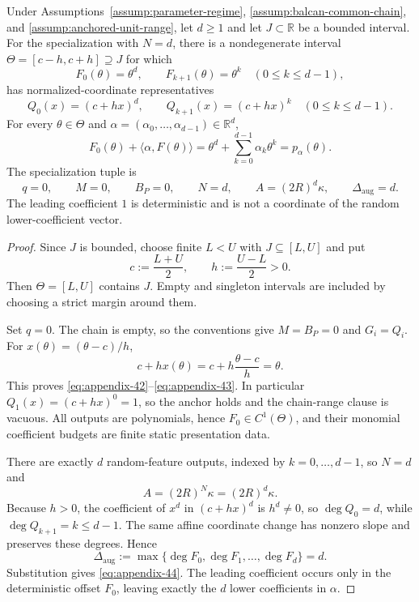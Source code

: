 \begin{proposition}
\label{prop:monic-presentation}
Under Assumptions~\ref{assump:parameter-regime},
\ref{assump:balcan-common-chain}, and
\ref{assump:anchored-unit-range}, let $d\geq1$ and let
$J\subset\mathbb R$ be a bounded interval.  For the specialization with
$N=d$, there is a nondegenerate interval
$\Theta=[c-h,c+h]\supseteq J$ for which
\begin{equation}
F_0(\theta)=\theta^d,
\qquad
F_{k+1}(\theta)=\theta^k\quad(0\leq k\leq d-1),
\label{eq:appendix-42}
\end{equation}
has normalized-coordinate representatives
\begin{equation}
Q_0(x)=(c+hx)^d,
\qquad
Q_{k+1}(x)=(c+hx)^k\quad(0\leq k\leq d-1).
\label{eq:appendix-43}
\end{equation}
For every $\theta\in\Theta$ and
$\alpha=(\alpha_0,\ldots,\alpha_{d-1})\in\mathbb R^d$,
\begin{equation}
F_0(\theta)+\langle\alpha,F(\theta)\rangle
=\theta^d+\sum_{k=0}^{d-1}\alpha_k\theta^k
=p_\alpha(\theta).
\label{eq:appendix-44}
\end{equation}
The specialization tuple is
\begin{equation}
q=0,
\qquad M=0,
\qquad B_P=0,
\qquad N=d,
\qquad A=(2R)^d\kappa,
\qquad \Delta_{\mathrm{aug}}=d.
\label{eq:appendix-45}
\end{equation}
The leading coefficient $1$ is deterministic and is not a coordinate of the
random lower-coefficient vector.
\end{proposition}

\begin{proof}
Since $J$ is bounded, choose finite $L<U$ with $J\subseteq[L,U]$ and put
\[
c:=\frac{L+U}{2},
\qquad
h:=\frac{U-L}{2}>0.
\]
Then $\Theta=[L,U]$ contains $J$.  Empty and singleton intervals are included
by choosing a strict margin around them.

Set $q=0$.  The chain is empty, so the conventions give
$M=B_P=0$ and $G_i=Q_i$.  For
$x(\theta)=(\theta-c)/h$,
\[
c+hx(\theta)=c+h\frac{\theta-c}{h}=\theta.
\]
This proves \eqref{eq:appendix-42}--\eqref{eq:appendix-43}.  In particular
$Q_1(x)=(c+hx)^0=1$, so the anchor holds and the chain-range clause is
vacuous.  All outputs are polynomials, hence $F_0\in C^1(\Theta)$, and their
monomial coefficient budgets are finite static presentation data.

There are exactly $d$ random-feature outputs, indexed by
$k=0,\ldots,d-1$, so $N=d$ and
\[
A=(2R)^N\kappa=(2R)^d\kappa.
\]
Because $h>0$, the coefficient of $x^d$ in $(c+hx)^d$ is
$h^d\neq0$, so $\deg Q_0=d$, while
$\deg Q_{k+1}=k\leq d-1$.  The same affine coordinate change has nonzero
slope and preserves these degrees.  Hence
\[
\Delta_{\mathrm{aug}}
:=\max\{\deg F_0,\deg F_1,\ldots,\deg F_d\}=d.
\]
Substitution gives \eqref{eq:appendix-44}.  The leading coefficient occurs only in the
deterministic offset $F_0$, leaving exactly the $d$ lower coefficients in
$\alpha$.
\end{proof}

